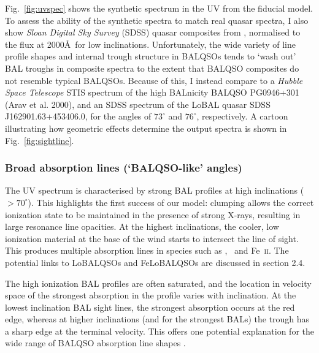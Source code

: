 \noindent
Fig.~\ref{fig:uvspec} shows the synthetic spectrum in the UV from the fiducial model. 
To assess the ability of the synthetic spectra to match real 
quasar spectra, I also show {\sl Sloan Digital Sky Survey} (SDSS) quasar
composites from \cite{reichard2003}, normalised to the flux at 2000\AA\
for low inclinations. Unfortunately, the wide variety of
line profile shapes and internal trough structure in BALQSOs
tends to `wash out' BAL troughs in composite spectra
to the extent that BALQSO composites do not resemble typical BALQSOs.
Because of this, I instead compare to a {\sl Hubble Space Telescope} 
STIS spectrum of the high BALnicity BALQSO PG0946+301 (Arav et al. 2000),
and an SDSS spectrum of the LoBAL quasar SDSS J162901.63+453406.0,
for the angles of $73^\circ$ and $76^\circ$, respectively. 
A cartoon illustrating how geometric effects determine
the output spectra is shown in Fig.~\ref{fig:sightline}.  

\subsubsection{Broad absorption lines (`BALQSO-like' angles)}
\label{sec:balqso_angles}

The UV spectrum is characterised by strong BAL 
profiles at high inclinations ($> 70^\circ$). 
This highlights the first success of our model: 
clumping allows the correct ionization state 
to be maintained in the presence of strong X-rays, 
resulting in large resonance line opacities. 
At the highest inclinations, the 
cooler, low ionization material at the base of the wind
starts to intersect the line of sight. This produces 
multiple absorption lines in species such as \mg,
\al\ and Fe~\textsc{ii}. The potential links to LoBALQSOs and 
FeLoBALQSOs are discussed in section 2.4.

The high ionization BAL profiles are often saturated, and the location in velocity space
of the strongest absorption in the profile varies with inclination.
At the lowest inclination BAL sight lines, the strongest absorption occurs at the red edge,
whereas at higher inclinations (and for the strongest BALs)
the trough has a sharp edge at the terminal velocity.
This offers one potential explanation for the wide range of BALQSO absorption
line shapes \citep[see e.g.][]{trump2006,knigge2008,filizak2014}.

